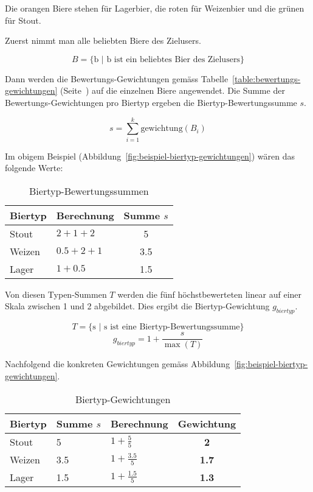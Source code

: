 \documentclass[10pt,a4paper]{scrartcl}
\begin{document}
Die orangen Biere stehen für Lagerbier, die roten für Weizenbier und die grünen für Stout.

Zuerst nimmt man alle beliebten Biere des Zielusers.

$$B = \{ \textrm{b $|$ b ist ein beliebtes Bier des Zielusers} \}$$

Dann werden die Bewertungs-Gewichtungen gemäss Tabelle~\ref{table:bewertungs-gewichtungen}
(Seite~\pageref{table:bewertungs-gewichtungen}) auf die einzelnen Biere angewendet. Die Summe der
Bewertungs-Gewichtungen pro Biertyp ergeben die Biertyp-Bewertungssumme $s$.

$$s = \sum_{i=1}^k \textrm{gewichtung}(B_i)$$

Im obigem Beispiel (Abbildung~\ref{fig:beispiel-biertyp-gewichtungen}) wären das folgende Werte:

\begin{table}[H]
	\begin{center}
		\begin{tabular}{llc}
			\toprule
			Biertyp & Berechnung & Summe $s$ \\
			\midrule
			Stout  & $2 + 1 + 2$   & 5 \\
			Weizen & $0.5 + 2 + 1$ & 3.5 \\
			Lager  & $1 + 0.5$     & 1.5 \\
			\bottomrule
		\end{tabular}
	\end{center}
	\caption{Biertyp-Bewertungssummen}
	\label{table:biertyp-bewertungs-summen}
\end{table}

Von diesen Typen-Summen $T$ werden die fünf höchstbewerteten linear auf einer Skala zwischen 1 und
2 abgebildet. Dies ergibt die Biertyp-Gewichtung $g_{biertyp}$.

$$T = \{ \textrm{s $|$ s ist eine Biertyp-Bewertungssumme} \}$$
$$g_{biertyp} = 1 + \frac{s}{\max(T)}$$

Nachfolgend die konkreten Gewichtungen gemäss Abbildung~\ref{fig:beispiel-biertyp-gewichtungen}.

\begin{table}[H]
	\begin{center}
		\begin{tabular}{lllc}
			\toprule
			Biertyp & Summe $s$ & Berechnung & Gewichtung \\
			\midrule
			Stout  & 5   & $1 + \frac{5}{5}$   & \textbf{2} \\
			Weizen & 3.5 & $1 + \frac{3.5}{5}$ & \textbf{1.7}   \\
			Lager  & 1.5 & $1 + \frac{1.5}{5}$ & \textbf{1.3} \\
			\bottomrule
		\end{tabular}
	\end{center}
	\label{biertyp-gewichtungen}
	\caption{Biertyp-Gewichtungen}
\end{table}
\end{document}
